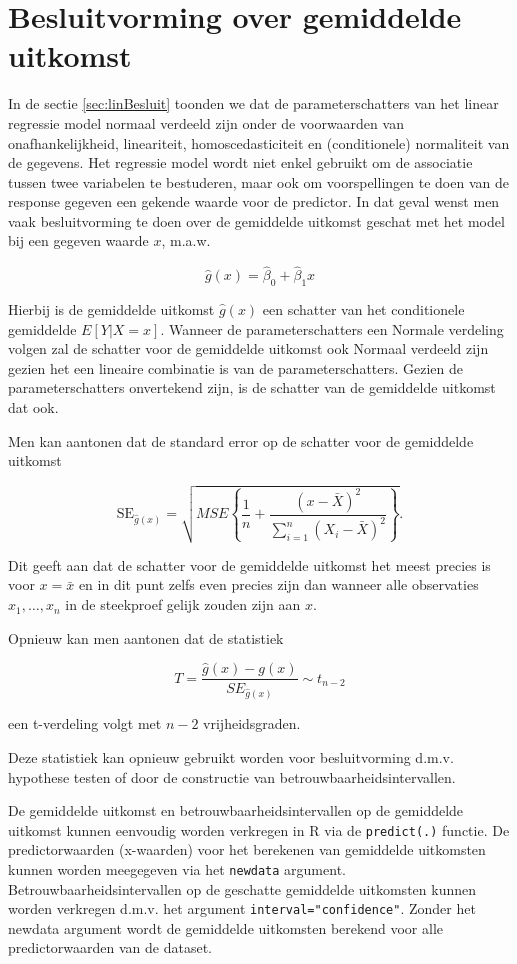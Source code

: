 \documentclass[
  12pt,dutch,coursenotes]{book}
\newcommand{\passthrough}[1]{#1}
\theoremstyle{definition}
\theoremstyle{definition}
\theoremstyle{definition}
\theoremstyle{definition}
\theoremstyle{remark}
\begin{document}
\hypertarget{besluitvorming-over-gemiddelde-uitkomst}{%
\section{Besluitvorming over gemiddelde uitkomst}\label{besluitvorming-over-gemiddelde-uitkomst}}

In de sectie \ref{sec:linBesluit} toonden we dat de parameterschatters van het linear regressie model normaal verdeeld zijn onder de voorwaarden van onafhankelijkheid, lineariteit, homoscedasticiteit en (conditionele) normaliteit van de gegevens.
Het regressie model wordt niet enkel gebruikt om de associatie tussen twee variabelen te bestuderen, maar ook om voorspellingen te doen van de response gegeven een gekende waarde voor de predictor.
In dat geval wenst men vaak besluitvorming te doen over de gemiddelde uitkomst geschat met het model bij een gegeven waarde \(x\), m.a.w.

\[\hat{g}(x)= \hat{\beta}_0 + \hat{\beta}_1 x\]

Hierbij is de gemiddelde uitkomst \(\hat{g}(x)\) een schatter van het conditionele gemiddelde \(E[Y\vert X=x]\).
Wanneer de parameterschatters een Normale verdeling volgen zal de schatter voor de gemiddelde uitkomst ook Normaal verdeeld zijn gezien het een lineaire combinatie is van de parameterschatters.
Gezien de parameterschatters onvertekend zijn, is de schatter van de gemiddelde uitkomst dat ook.

Men kan aantonen dat de standard error op de schatter voor de gemiddelde uitkomst

\[\text{SE}_{\hat{g}(x)}=\sqrt{MSE\left\{\frac{1}{n}+\frac{(x-\bar X)^2}{\sum\limits_{i=1}^n (X_i-\bar X)^2}\right\}}.\]

Dit geeft aan dat de schatter voor de gemiddelde uitkomst het meest precies is voor \(x=\bar x\) en in dit punt zelfs even precies zijn dan wanneer alle observaties \(x_1,\ldots, x_n\) in de steekproef gelijk zouden zijn aan \(x\).

Opnieuw kan men aantonen dat de statistiek

\[T=\frac{\hat{g}(x)-g(x)}{SE_{\hat{g}(x)}}\sim t_{n-2}\]

een t-verdeling volgt met \(n-2\) vrijheidsgraden.

Deze statistiek kan opnieuw gebruikt worden voor besluitvorming d.m.v. hypothese testen of door de constructie van betrouwbaarheidsintervallen.

De gemiddelde uitkomst en betrouwbaarheidsintervallen op de gemiddelde uitkomst kunnen eenvoudig worden verkregen in R via de \passthrough{\lstinline!predict(.)!} functie.
De predictorwaarden (x-waarden) voor het berekenen van gemiddelde uitkomsten kunnen worden meegegeven via het \passthrough{\lstinline!newdata!} argument.
Betrouwbaarheidsintervallen op de geschatte gemiddelde uitkomsten kunnen worden verkregen d.m.v. het argument \passthrough{\lstinline!interval="confidence"!}.
Zonder het newdata argument wordt de gemiddelde uitkomsten berekend voor alle predictorwaarden van de dataset.
\end{document}
